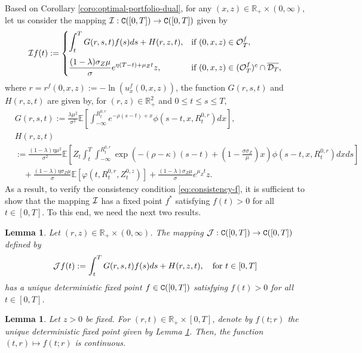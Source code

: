 \documentclass[11pt,times,letter]{article}
\newcommand{\Ex}{ \mathbb{E} }
\newcommand{\R}{\mathds{R}}
\newcommand{\C}{{\tt{C}}}
\numberwithin{equation}{section}
\newtheorem{lemma}[theorem]{Lemma}
\begin{document}
Based on Corollary \ref{coro:optimal-portfolio-dual}, for any $(x,z)\in \R_+\times (0,\infty)$, let us consider the mapping ${\cal I}:\C([0,T])\to \C([0,T])$ given by
\begin{align}\label{eq:Phi}
{\cal I} f(t):=
\begin{cases}
\displaystyle \int_t^T G(r,s,t)f(s)ds+H(r,z,t), & \text{if}~(0,x,z)\in {\cal O}_T^f,\\[1.2em]
\displaystyle \frac{(1-\lambda)\sigma_Z\mu}{\sigma}e^{\eta (T-t)+\mu_Z t}z, &\text{if}~(0,x,z)\in (\mathcal{O}_T^f)^c \cap \overline{\mathcal{D}_T},
\end{cases}
\end{align}
where $r=r^f(0,x,z):=-\ln(u_x^f(0,x,z))$, the function $G(r,s,t)$ and $H(r,z,t)$ are given by, for $(r,z)\in\R_+^2$ and $0\leq t\leq s\leq T$,
\begin{align}
&G(r,s,t):=\frac{\lambda \mu^2}{\sigma^2} \Ex\left[\int_{-\infty}^{R_t^{0,r}} e^{-\rho (s-t)+x}\phi(s-t,x,R_t^{0,r})dx \right],\label{eq:G}\\
&H(r,z,t)\label{eq:H}\nonumber\\
&:=\frac{(1-\lambda)\eta \mu^2}{\sigma^2} \Ex\left[Z_t\int_{t}^{T}\int_{-\infty}^{R_t^{0,r}} \exp\left(-(\rho-\kappa)(s-t)+\left(1-\frac{\sigma\sigma_Z}{\mu}\right)x\right) \phi(s-t,x,R_t^{0,r})dx ds\right]\nonumber\\
&\quad+\frac{(1-\lambda)\eta\sigma_Z\mu}{\sigma}  \Ex\left[\varphi(t,R_t^{0,r},Z_t^{0,z})\right]+\frac{(1-\lambda)\sigma_Z\mu}{\sigma}e^{\mu_Z t}z.
\end{align}
As a result, to verify the consistency condition \eqref{eq:consistency-f}, it is sufficient to show that the  mapping ${\cal I}$ has a fixed point $f^*$ satisfying $f(t)>0$ for all $t\in[0,T]$. To this end, we need the next two results.


\begin{lemma}\label{lem:fixpoint-r}
Let $(r,z)\in \R_+\times (0,\infty)$. The mapping ${\cal J}:\C([0,T])\to \C([0,T])$ defined by
\begin{align}\label{eq:map-J}
{\cal J}f(t):=\int_t^T G(r,s,t) f(s) ds+H(r,z,t),\quad \text{for}~t\in[0,T]
\end{align}
has a unique deterministic fixed point $f\in \C([0,T])$ satisfying $f(t)>0$ for all $t\in[0,T]$.
\end{lemma}


\begin{lemma}\label{lem:continuity-f}
Let $z>0$ be fixed. For $(r,t)\in\R_+\times[0,T]$, denote by $f(t;r)$ the unique deterministic fixed point given by Lemma \ref{lem:fixpoint-r}. Then, the function $(t,r)\mapsto f(t;r)$ is continuous.
\end{lemma}
\end{document}
